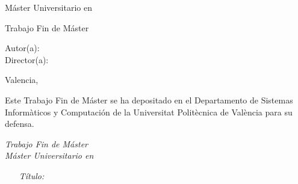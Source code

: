 \begin{titlepage}
\vspace*{0.5cm}
\begin{center}
\Large{Máster Universitario en  \Master{} }
\end{center}

\vspace*{0.5cm}
\begin{center}
\huge{ Trabajo Fin de Máster }
\end{center}

\vspace*{0.5cm}
\begin{center}
\huge\bfseries {  \TituloTFM{} } 
\end{center}

\vspace*{7cm} %

\noindent
\large{Autor(a): \NombreAutor{} }\\
\large{Director(a): \NombreDirector{} } \\

\vspace*{3cm} %
\begin{center}
Valencia, \Fecha
\end{center}

\newpage
\thispagestyle{empty}
\noindent
Este Trabajo Fin de Máster se ha depositado en el Departamento de Sistemas Informàticos y Computación de la Universitat Politècnica de València para su defensa.

\vspace*{4cm}
\noindent
\textit{Trabajo Fin de Máster}\\
\textit{Máster Universitario en} \Master{}

\begin{enumerate}
\item[\textit{Título:}] \TituloTFM{}
\end{enumerate}
\Fecha


\vspace*{3cm}


\end{titlepage}
